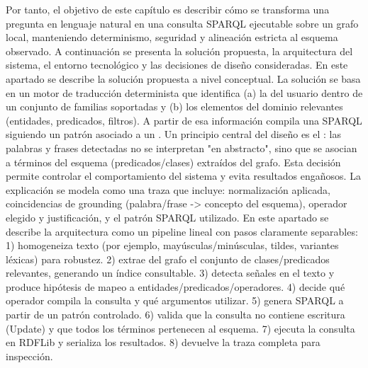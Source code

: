 {}Por tanto, el objetivo de este capítulo es describir cómo se transforma una pregunta en lenguaje natural en una consulta SPARQL ejecutable sobre un grafo local, manteniendo determinismo, seguridad y alineación estricta al esquema observado.\markdownRendererInterblockSeparator
{}A continuación se presenta la solución propuesta, la arquitectura del sistema, el entorno tecnológico y las decisiones de diseño consideradas.\markdownRendererInterblockSeparator
{}\markdownRendererInterblockSeparator
{}En este apartado se describe la solución propuesta a nivel conceptual. La solución se basa en un motor de traducción determinista que identifica (a) la  del usuario dentro de un conjunto de familias soportadas y (b) los elementos del dominio relevantes (entidades, predicados, filtros). A partir de esa información compila una SPARQL siguiendo un patrón asociado a un .\markdownRendererInterblockSeparator
{}Un principio central del diseño es el : las palabras y frases detectadas no se interpretan "en abstracto", sino que se asocian a términos del esquema (predicados/clases) extraídos del grafo. Esta decisión permite controlar el comportamiento del sistema y evita resultados engañosos.\markdownRendererInterblockSeparator
{}La explicación se modela como una traza que incluye: normalización aplicada, coincidencias de grounding (palabra/frase -> concepto del esquema), operador elegido y justificación, y el patrón SPARQL utilizado.\markdownRendererInterblockSeparator
{}\markdownRendererInterblockSeparator
{}En este apartado se describe la arquitectura como un pipeline lineal con pasos claramente separables:\markdownRendererInterblockSeparator
{}1)  homogeneiza texto (por ejemplo, mayúsculas/minúsculas, tildes, variantes léxicas) para robustez. 2)  extrae del grafo el conjunto de clases/predicados relevantes, generando un índice consultable. 3)  detecta señales en el texto y produce hipótesis de mapeo a entidades/predicados/operadores. 4)  decide qué operador compila la consulta y qué argumentos utilizar. 5)  genera SPARQL a partir de un patrón controlado. 6)  valida que la consulta no contiene escritura (Update) y que todos los términos pertenecen al esquema. 7)  ejecuta la consulta en RDFLib y serializa los resultados. 8)  devuelve la traza completa para inspección.\markdownRendererInterblockSeparator
